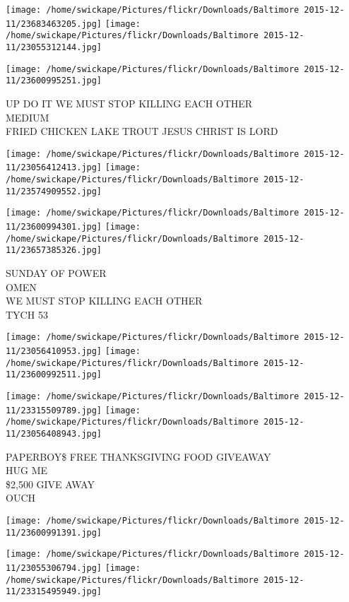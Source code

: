 \documentclass[10pt,letterpaper]{article}
\begin{document}
\texttt{[image: /home/swickape/Pictures/flickr/Downloads/Baltimore 2015-12-11/23683463205.jpg]}
\texttt{[image: /home/swickape/Pictures/flickr/Downloads/Baltimore 2015-12-11/23055312144.jpg]}

\vspace{0.25in}
\texttt{[image: /home/swickape/Pictures/flickr/Downloads/Baltimore 2015-12-11/23600995251.jpg]}

UP DO IT WE MUST STOP KILLING EACH OTHER\\
MEDIUM\\
FRIED CHICKEN LAKE TROUT JESUS CHRIST IS LORD
\pagebreak

\texttt{[image: /home/swickape/Pictures/flickr/Downloads/Baltimore 2015-12-11/23056412413.jpg]}
\texttt{[image: /home/swickape/Pictures/flickr/Downloads/Baltimore 2015-12-11/23574909552.jpg]}

\texttt{[image: /home/swickape/Pictures/flickr/Downloads/Baltimore 2015-12-11/23600994301.jpg]}
\texttt{[image: /home/swickape/Pictures/flickr/Downloads/Baltimore 2015-12-11/23657385326.jpg]}

SUNDAY OF POWER\\
OMEN\\
WE MUST STOP KILLING EACH OTHER\\
TYCH 53
\pagebreak

\texttt{[image: /home/swickape/Pictures/flickr/Downloads/Baltimore 2015-12-11/23056410953.jpg]}
\texttt{[image: /home/swickape/Pictures/flickr/Downloads/Baltimore 2015-12-11/23600992511.jpg]}

\texttt{[image: /home/swickape/Pictures/flickr/Downloads/Baltimore 2015-12-11/23315509789.jpg]}
\texttt{[image: /home/swickape/Pictures/flickr/Downloads/Baltimore 2015-12-11/23056408943.jpg]}

PAPERBOY\$ FREE THANKSGIVING FOOD GIVEAWAY\\
HUG ME\\
\$2,500 GIVE AWAY\\
OUCH
\pagebreak

\texttt{[image: /home/swickape/Pictures/flickr/Downloads/Baltimore 2015-12-11/23600991391.jpg]}

\vspace{0.25in}
\texttt{[image: /home/swickape/Pictures/flickr/Downloads/Baltimore 2015-12-11/23055306794.jpg]}
\texttt{[image: /home/swickape/Pictures/flickr/Downloads/Baltimore 2015-12-11/23315495949.jpg]}
\end{document}
